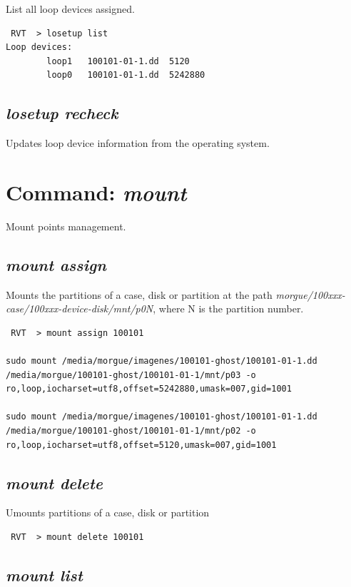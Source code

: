 \documentclass[a4paper,11pt,oneside]{report}
\begin{document}
List all loop devices assigned.

\begin{verbatim}
 RVT  > losetup list                                                          
Loop devices: 
        loop1   100101-01-1.dd  5120
        loop0   100101-01-1.dd  5242880
\end{verbatim}


\subsection{\emph{losetup recheck}}

Updates loop device information from the operating system.


\section{Command: \emph{mount}}

Mount points management.

\subsection{\emph{mount assign}}

Mounts the partitions of a case, disk or partition at the path \emph{morgue/100xxx-case/100xxx-device-disk/mnt/p0N}, where N is the partition number.

\begin{verbatim}
 RVT  > mount assign 100101

sudo mount /media/morgue/imagenes/100101-ghost/100101-01-1.dd /media/morgue/100101-ghost/100101-01-1/mnt/p03 -o ro,loop,iocharset=utf8,offset=5242880,umask=007,gid=1001

sudo mount /media/morgue/imagenes/100101-ghost/100101-01-1.dd /media/morgue/100101-ghost/100101-01-1/mnt/p02 -o ro,loop,iocharset=utf8,offset=5120,umask=007,gid=1001
\end{verbatim}


\subsection{\emph{mount delete}}

Umounts partitions of a case, disk or partition

\begin{verbatim}
 RVT  > mount delete 100101
\end{verbatim}


\subsection{\emph{mount list}}
\end{document}
